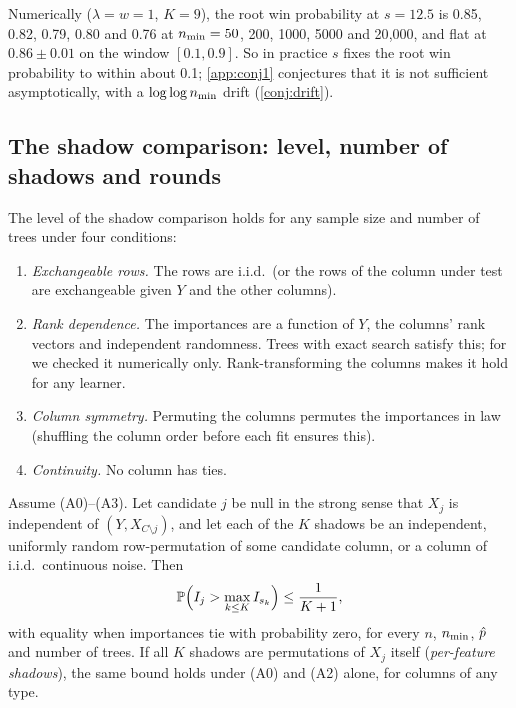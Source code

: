 Numerically ($\lambda = w = 1$, $K = 9$), the root win probability at $s = 12.5$ is 0.85, 0.82, 0.79, 0.80 and 0.76 at $\nmin = 50$, 200, 1000, 5000 and 20{,}000, and flat at $0.86 \pm 0.01$ on the window $[0.1,0.9]$. So in practice $s$ fixes the root win probability to within about 0.1; \cref{app:conj1} conjectures that it is not sufficient asymptotically, with a $\log\log\nmin$ drift (\cref{conj:drift}).

\subsection{The shadow comparison: level, number of shadows and rounds}\label{sec:level}

The level of the shadow comparison holds for any sample size and number of trees under four conditions:
\begin{enumerate}[label=(A\arabic*),start=0]
  \item \emph{Exchangeable rows.} The rows are i.i.d.\ (or the rows of the column under test are exchangeable given $Y$ and the other columns).
  \item \emph{Rank dependence.} The importances are a function of $Y$, the columns' rank vectors and independent randomness. Trees with exact search satisfy this; for  we checked it numerically only. Rank-transforming the columns makes it hold for any learner.
  \item \emph{Column symmetry.} Permuting the columns permutes the importances in law (shuffling the column order before each fit ensures this).
  \item \emph{Continuity.} No column has ties.
\end{enumerate}

\begin{proposition}\label{prop:level}
Assume (A0)--(A3). Let candidate $j$ be null in the strong sense that $X_j$ is independent of $(Y, X_{C\setminus j})$, and let each of the $K$ shadows be an independent, uniformly random row-permutation of some candidate column, or a column of i.i.d.\ continuous noise. Then
\[
  \P\Bigl(I_j > \max_{k\le K} I_{s_k}\Bigr) \le \frac{1}{K+1},
\]
with equality when importances tie with probability zero, for every $n$, $\nmin$, $\phat$ and number of trees. If all $K$ shadows are permutations of $X_j$ itself (\emph{per-feature shadows}), the same bound holds under (A0) and (A2) alone, for columns of any type.
\end{proposition}

